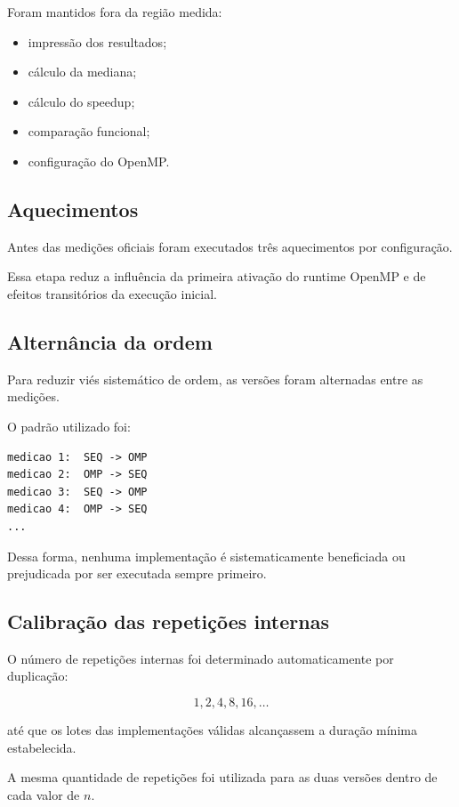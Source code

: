 Foram mantidos fora da região medida:

\begin{itemize}
    \item impressão dos resultados;
    \item cálculo da mediana;
    \item cálculo do speedup;
    \item comparação funcional;
    \item configuração do OpenMP.
\end{itemize}


\subsection{Aquecimentos}

Antes das medições oficiais foram executados três aquecimentos por
configuração.

Essa etapa reduz a influência da primeira ativação do runtime OpenMP e de
efeitos transitórios da execução inicial.


\subsection{Alternância da ordem}

Para reduzir viés sistemático de ordem, as versões foram alternadas entre
as medições.

O padrão utilizado foi:

\begin{verbatim}
medicao 1:  SEQ -> OMP
medicao 2:  OMP -> SEQ
medicao 3:  SEQ -> OMP
medicao 4:  OMP -> SEQ
...
\end{verbatim}

Dessa forma, nenhuma implementação é sistematicamente beneficiada ou
prejudicada por ser executada sempre primeiro.


\subsection{Calibração das repetições internas}

O número de repetições internas foi determinado automaticamente por
duplicação:

\[
1,2,4,8,16,\ldots
\]

até que os lotes das implementações válidas alcançassem a duração mínima
estabelecida.

A mesma quantidade de repetições foi utilizada para as duas versões dentro
de cada valor de \(n\).


